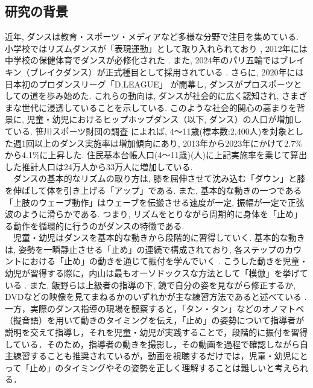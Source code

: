 \documentclass[technicalreport]{ieicej}
\begin{document}
\subsection{研究の背景}
近年, ダンスは教育・スポーツ・メディアなど多様な分野で注目を集めている. 小学校ではリズムダンスが「表現運動」として取り入れられており \cite{ref1}, 2012年には中学校の保健体育でダンスが必修化された \cite{ref2}. また, 2024年のパリ五輪ではブレイキン（ブレイクダンス）が正式種目として採用されている \cite{ref3}. さらに, 2020年には日本初のプロダンスリーグ「D.LEAGUE」 \cite{ref4}が開幕し, ダンスがプロスポーツとしての道を歩み始めた. これらの動向は, ダンスが社会的に広く認知され, さまざまな世代に浸透していることを示している. このような社会的関心の高まりを背景に, 児童・幼児におけるヒップホップダンス（以下, ダンス）の人口が増加している. 笹川スポーツ財団の調査 \cite{ref5} によれば, 4〜11歳(標本数:2,400人)を対象とした週1回以上のダンス実施率は増加傾向にあり, 2013年から2023年にかけて2.7\%から4.1\%に上昇した. 住民基本台帳人口(4〜11歳)(人)に上記実施率を乗じて算出した推計人口は24万人から33万人に増加している. \\
　ダンスの基本的なリズムの取り方は, 膝を屈伸させて沈み込む「ダウン」と膝を伸ばして体を引き上げる「アップ」である\cite{ref7}. また, 基本的な動きの一つである「上肢のウェーブ動作」はウェーブを伝搬させる速度が一定, 振幅が一定で正弦波のように滑らかである. つまり, リズムをとりながら周期的に身体を「止め」る動作を循環的に行うのがダンスの特徴である. \\
　児童・幼児はダンスを基本的な動きから段階的に習得していく. 基本的な動きは, 姿勢を一瞬静止させる「止め」の連続で構成されており, 各ステップのカウントにおける「止め」の動きを通じて振付を学んでいく \cite{ref7}. こうした動きを児童・幼児が習得する際に，内山は最もオーソドックスな方法として「模倣」を挙げている \cite{ref8}. また, 飯野らは上級者の指導の下, 鏡で自分の姿を見ながら修正するか, DVDなどの映像を見てまねるかのいずれかが主な練習方法であると述べている \cite{ref9}. 一方，実際のダンス指導の現場を観察すると，「タン・タン」などのオノマトペ（擬音語）を用いて動きのタイミングを伝え，「止め」の姿勢について指導者が説明を交えて指導し，それを児童・幼児が実践することで，段階的に振付を習得している．そのため，指導者の動きを撮影し，その動画を過程で確認しながら自主練習することも推奨されているが，動画を視聴するだけでは，児童・幼児にとって「止め」のタイミングやその姿勢を正しく理解することは難しいと考えられる．
\end{document}

